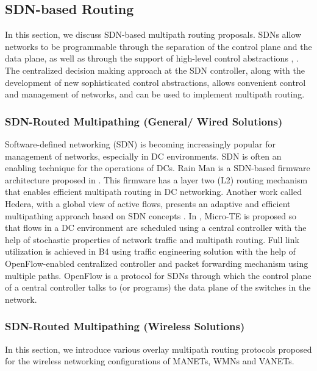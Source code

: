 \documentclass[10pt]{IEEEtran}
\begin{document}
\subsection{SDN-based Routing}
\label{subsec:sdn_based}

In this section, we discuss SDN-based multipath routing proposals. SDNs allow networks to be programmable through the separation of the control plane and the data plane, as well as through the support of high-level control abstractions \cite{qadir2014prog}, \cite{qadir2014acmfit}. The centralized decision making approach at the SDN controller, along with the development of new sophisticated control abstractions, allows convenient control and management of networks, and can be used to implement multipath routing. 

\subsubsection{SDN-Routed Multipathing (General/ Wired Solutions)}
\label{subsub: w_g_sdn}

Software-defined networking (SDN) is becoming increasingly popular for management of networks, especially in DC environments. SDN is often an enabling technique for the operations of DCs. Rain Man is a SDN-based firmware architecture proposed in \cite{stephens2012designing}. This firmware has a layer two (L2) routing mechanism that enables efficient multipath routing in DC networking. Another work called Hedera, with a global view of active flows, presents an adaptive and efficient multipathing approach based on SDN concepts \cite{al2010hedera}. In \cite{benson2011microte}, Micro-TE is proposed so that flows in a DC environment are scheduled using a central controller with the help of stochastic properties of network traffic and multipath routing. Full link utilization is achieved in B4 \cite{jain2013b4} using traffic engineering solution with the help of OpenFlow-enabled centralized controller and packet forwarding mechanism using multiple paths. OpenFlow is a protocol for SDNs through which the control plane of a central controller talks to (or programs) the data plane of the switches in the network.

\vspace{2mm}
\subsubsection{SDN-Routed Multipathing (Wireless Solutions)}

In this section, we introduce various overlay multipath routing protocols proposed for the wireless networking configurations of MANETs, WMNs and VANETs.
\end{document}
